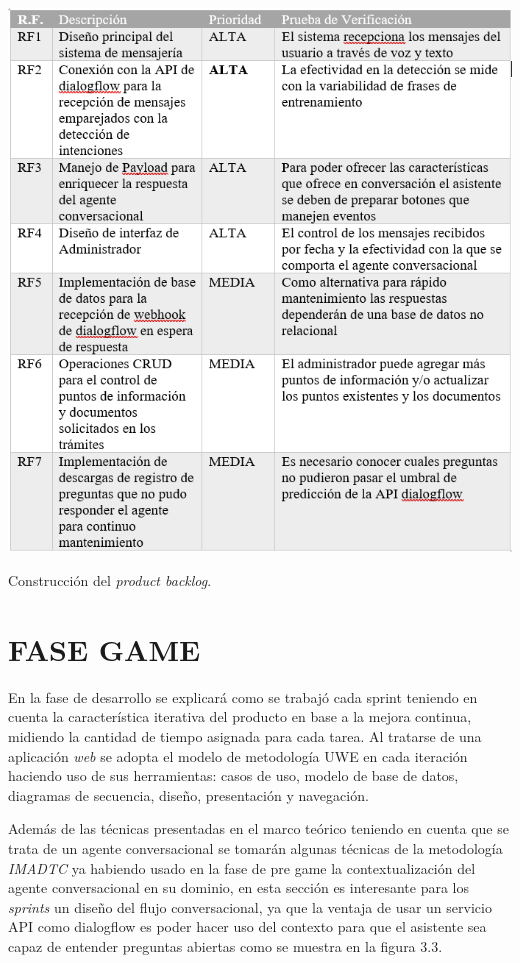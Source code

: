 \documentclass[letter, openright, 12pt]{book}
\begin{document}
\begin{table}[!ht]
\includegraphics[width=1\textwidth]{tabla3_7}
\caption{Construcción del {\it product backlog}. } 
\label{tab:tabla3_7} 
\end{table}

\section{FASE GAME}

En la fase de desarrollo se explicará como se trabajó cada sprint teniendo en cuenta la característica iterativa del producto en base a la mejora continua, midiendo la cantidad de tiempo asignada para cada tarea. Al tratarse de una aplicación {\it web} se adopta el modelo de metodología UWE en cada iteración haciendo uso de sus herramientas: casos de uso, modelo de base de datos, diagramas de secuencia, diseño, presentación y navegación. 
\par
Además de las técnicas presentadas en el marco teórico teniendo en cuenta que se trata de un agente conversacional se tomarán algunas técnicas de la metodología {\it IMADTC} ya habiendo usado en la fase de pre game la contextualización del agente conversacional en su dominio, en esta sección es interesante para los {\it sprints} un diseño del flujo conversacional, ya que la ventaja de usar un servicio API como dialogflow es poder hacer uso del contexto para que el asistente sea capaz de entender preguntas abiertas como se muestra en la figura 3.3. 
\end{document}
